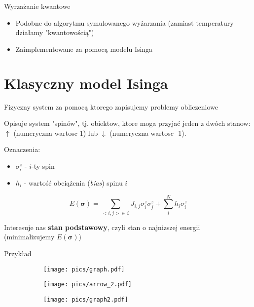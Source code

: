 \documentclass[11pt, xcolor={dvipsnames,svgnames},aspectratio=169]{beamer}
\begin{document}
	\begin{frame}{Wyrzażanie kwantowe}
		
		\begin{itemize}
			\item Podobne do algorytmu symulowanego wyżarzania (zamiast temperatury działamy "kwantowością")
			\item Zaimplementowane za pomocą modelu Isinga
		\end{itemize}
		
	\end{frame}

	\section{Klasyczny model Isinga}
	
	\begin{frame}
		Fizyczny system za pomocą ktorego zapisujemy problemy obliczeniowe
		
		Opisuje system "spinów", tj. obiektow, ktore moga przyjać jeden z dwóch stanow: $\uparrow$ (numeryczna wartosc 1) lub $\downarrow$ (numeryczna wartosc -1).
		
		 
		
	\end{frame}
	
	\begin{frame}
		Oznaczenia:
		\begin{itemize}
			\item $\sigma^{z}_i$ - $i$-ty spin
			\item $h_i$ - wartość obciążenia (\textit{bias}) spinu $i$
		\end{itemize}
		 \begin{tcolorbox}[title=Klasyczny model Isinga, colframe=margeurite]
		 	\begin{equation*}
		 		E(\bm{\sigma}) = \sum\limits_{<i,j> \in \mathcal{E}} J_{i,j} \sigma^z_i \sigma^z_j + \sum\limits_i^N h_i \sigma^z_i
		 	\end{equation*}
		 \end{tcolorbox}
		 
		 Interesuje nas \textbf{stan podstawowy}, czyli stan o najnizszej energii (minimalizujemy $E(\bm{\sigma})$)
	\end{frame}
	
	\begin{frame}{Przykład}
		
		 \begin{figure}
			\centering
			\begin{subfigure}[c]{0.3\textwidth}
				\centering
				\texttt{[image: pics/graph.pdf]}
			\end{subfigure}
			\hfill
			\begin{subfigure}[c]{0.3\textwidth}
				\centering
				\texttt{[image: pics/arrow\_2.pdf]}
				
			\end{subfigure}
			\hfill
			\begin{subfigure}[c]{0.3\textwidth}
				\centering
				\texttt{[image: pics/graph2.pdf]}
			\end{subfigure}
		\end{figure}
	\end{frame}
	
	\begin{frame}
		
		
		
	\end{frame}
	
\end{document}
